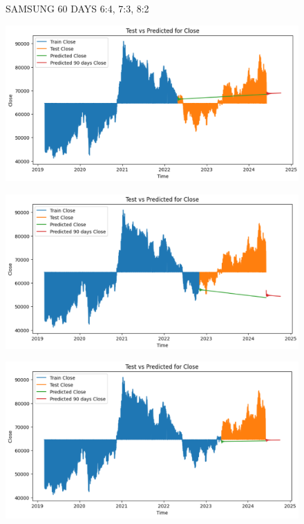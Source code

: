 \documentclass{article}
\begin{document}
\begin{multicols}{2}
\begin{figure}[H]
\begin{minipage}{0.15\textwidth}
    \label{fig:3}
    \end{minipage}
    \caption{SAMSUNG 60 DAYS  6:4, 7:3, 8:2 }
\end{figure}

\begin{figure}[H]
    \centering
    \begin{minipage}{0.15\textwidth}
    \centering
    \includegraphics[width=1\textwidth]{Image/VARMA/SAMSUNG/6_4/90.png}
   
    \label{fig:1}
    \end{minipage}%
    \begin{minipage}{0.15\textwidth}
    \centering
    \includegraphics[width=1\textwidth]{Image/VARMA/SAMSUNG/7_3/90.png}
  
    \label{fig:2}
    \end{minipage}%
    \begin{minipage}{0.15\textwidth}
    \centering
    \includegraphics[width=1\textwidth]{Image/VARMA/SAMSUNG/8_2/90.png}


\end{minipage}
\end{figure}
\end{multicols}
\end{document}

